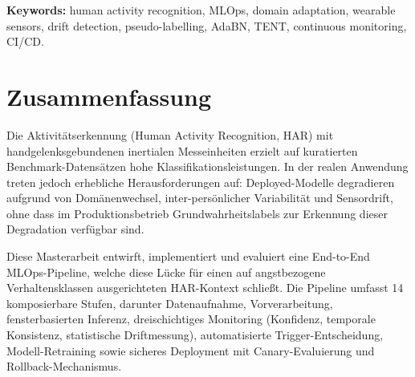 \vspace{0.5cm}
\noindent\textbf{Keywords:} human activity recognition, MLOps, domain adaptation,
wearable sensors, drift detection, pseudo-labelling, AdaBN, TENT,
continuous monitoring, CI/CD.

\chapter*{Zusammenfassung}

Die Aktivitätserkennung (Human Activity Recognition, HAR) mit handgelenksgebundenen
inertialen Messeinheiten erzielt auf kuratierten Benchmark-Datensätzen hohe
Klassifikationsleistungen.
In der realen Anwendung treten jedoch erhebliche Herausforderungen auf:
Deployed-Modelle degradieren aufgrund von Domänenwechsel, inter-persönlicher
Variabilität und Sensordrift, ohne dass im Produktionsbetrieb Grundwahrheitslabels
zur Erkennung dieser Degradation verfügbar sind.

Diese Masterarbeit entwirft, implementiert und evaluiert eine End-to-End
MLOps-Pipeline, welche diese Lücke für einen auf angstbezogene Verhaltensklassen
ausgerichteten HAR-Kontext schließt.
Die Pipeline umfasst 14 komposierbare Stufen, darunter Datenaufnahme,
Vorverarbeitung, fensterbasierten Inferenz, dreischichtiges Monitoring
(Konfidenz, temporale Konsistenz, statistische Driftmessung), automatisierte
Trigger-Entscheidung, Modell-Retraining sowie sicheres Deployment mit
Canary-Evaluierung und Rollback-Mechanismus.

\cleardoublepage
